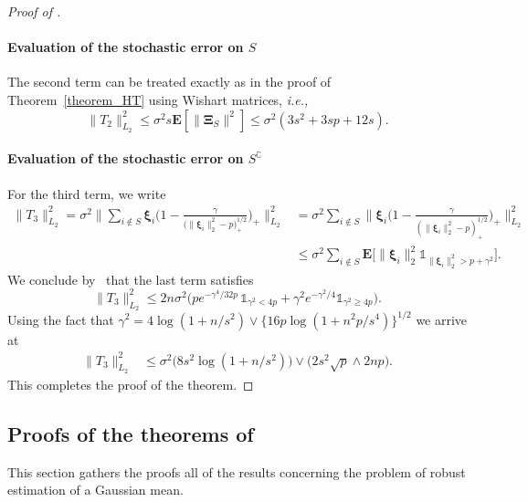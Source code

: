 \documentclass[sts,preprint,reqno,a4paper]{imsart}
\def\ie{\textit{i.e., }}
\def\bxi{\boldsymbol\xi}
\def\bXi{\boldsymbol\Xi}
\def\fcar{\mathds{1}}
\def\esp{\mathbf E}
\theoremstyle{plain}
\theoremstyle{remark}
\theoremstyle{definition}
\begin{document}
\begin{proof}[Proof of ]
	\paragraph{Evaluation of the stochastic error on $S$} 
	The second term can be treated
	exactly as in the proof of Theorem~\ref{theorem_HT} using Wishart matrices, \ie
	\begin{equation}
	\|T_2\|_{L_2}^2 \le \sigma^2 s\esp[\|\bXi_S\|^2] \le \sigma^2(3s^2+3sp+12s).
	\end{equation}
	
	\paragraph{Evaluation of the stochastic error on $S^\complement$} For the third term,
	we write
	\begin{align}
		\|T_3\|_{L_2}^2=\sigma^2\bigg\| \sum_{i\not\in S} \bxi_i
		\bigg(1-\frac{\gamma}{\big(\|\bxi_i\|^2_2-p\big)_+^{1/2}}\bigg)_+\bigg\|_{L_2}^2
			&= \sigma^2\sum_{i\not\in S} \bigg\|\bxi_i\bigg(1-\frac{\gamma}{(\|\bxi_i\|^2_2
				-p)_+^{1/2}}\bigg)_+\bigg\|_{L_2}^2\\
			&\le \sigma^2\sum_{i\not\in S} \esp\big[\|\bxi_i\|_2^2 \fcar_{\|\bxi_i\|_2^2> p+
			\gamma^2}\big].
	\end{align}
  We conclude by~ that the last term satisfies
	\begin{equation}
		\|T_3\|_{L_2}^2\le 
		2n\sigma^2  \big( pe^{-\gamma^4/32p}\,\fcar_{\gamma^2< 4p} +
		\gamma^2e^{-\gamma^2/4}\fcar_{\gamma^2\ge 4p}\big).
	\end{equation}
	Using the fact that $\gamma^2= 4\log(1+n/s^2)\vee\big\{16p\log(1+n^2p/s^4)
	\big\}^{1/2}$ we arrive at
	\begin{align}
	\|T_3\|_{L_2}^2
	    &\le \sigma^2	\Big(8s^2\log(1+n/s^2)\Big)\vee \Big(2s^2\sqrt{p}
			\wedge 2np\Big).
	\end{align}
This completes the proof of the theorem. \end{proof}

\subsection{Proofs of the theorems of }\label{proofs_robust}

This section gathers the proofs all of the results concerning the problem of robust
estimation of a Gaussian mean. 
\end{document}
